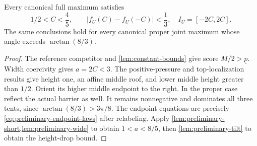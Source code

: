 \begin{corollary}\label{lem:canonical-range}\label{lem:preliminary-cuts}
Every canonical full maximum satisfies
\[
 1/2<C<\frac45,\qquad
 |f_U(C)-f_U(-C)|<\frac13,
 \quad I_U=[-2C,2C].
\]
The same conclusions hold for every canonical proper joint maximum
whose angle exceeds $\arctan(8/3)$.
\end{corollary}
\begin{proof}
The reference competitor and \cref{lem:constant-bounds} give
score $M/2>\underline p$. Width coercivity gives $a=2C<3$.
The positive-pressure and top-localization results give height one,
an affine middle roof, and lower middle height greater than $1/2$.
Orient its higher middle endpoint to the right. In the proper case
reflect the actual barrier as well. It remains nonnegative and
dominates all three tents, since
$\arctan(8/3)>3\pi/8$. The endpoint equations are precisely
\cref{eq:preliminary-endpoint-laws} after relabeling.
Apply \cref{lem:preliminary-short,lem:preliminary-wide} to obtain
$1<a<8/5$, then \cref{lem:preliminary-tilt} to obtain
the height-drop bound.
\end{proof}
